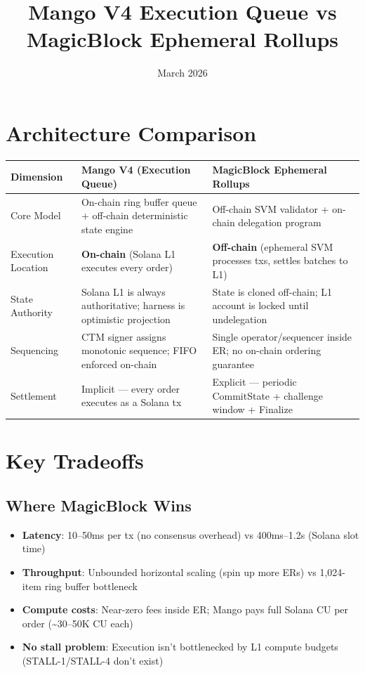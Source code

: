 \documentclass[11pt]{article}
\title{Mango V4 Execution Queue vs MagicBlock Ephemeral Rollups}
\date{March 2026}
\begin{document}
\maketitle

\section{Architecture Comparison}

\begin{longtable}{p{3cm}p{5.5cm}p{5.5cm}}
\toprule
\textbf{Dimension} & \textbf{Mango V4 (Execution Queue)} & \textbf{MagicBlock Ephemeral Rollups} \\
\midrule
Core Model & On-chain ring buffer queue + off-chain deterministic state engine & Off-chain SVM validator + on-chain delegation program \\
\midrule
Execution Location & \textbf{On-chain} (Solana L1 executes every order) & \textbf{Off-chain} (ephemeral SVM processes txs, settles batches to L1) \\
\midrule
State Authority & Solana L1 is always authoritative; harness is optimistic projection & State is cloned off-chain; L1 account is locked until undelegation \\
\midrule
Sequencing & CTM signer assigns monotonic sequence; FIFO enforced on-chain & Single operator/sequencer inside ER; no on-chain ordering guarantee \\
\midrule
Settlement & Implicit --- every order executes as a Solana tx & Explicit --- periodic CommitState + challenge window + Finalize \\
\bottomrule
\end{longtable}

\section{Key Tradeoffs}

\subsection{Where MagicBlock Wins}

\begin{itemize}
  \item \textbf{Latency}: 10--50ms per tx (no consensus overhead) vs 400ms--1.2s (Solana slot time)
  \item \textbf{Throughput}: Unbounded horizontal scaling (spin up more ERs) vs 1,024-item ring buffer bottleneck
  \item \textbf{Compute costs}: Near-zero fees inside ER; Mango pays full Solana CU per order (\textasciitilde30--50K CU each)
  \item \textbf{No stall problem}: Execution isn't bottlenecked by L1 compute budgets (STALL-1/STALL-4 don't exist)
\end{itemize}
\end{document}
